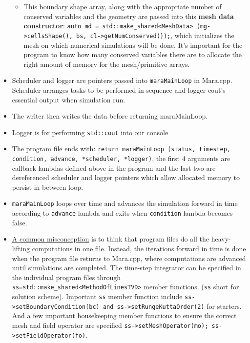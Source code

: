 \documentclass{article}
\begin{document}
\begin{itemize}
\begin{itemize}
		\item This boundary shape array, along with the appropriate number of conserved variables and the geometry are passed into this \textbf{mesh data constructor}: \texttt{auto md = std::make\_shared<MeshData> (mg->cellsShape(), bs, cl->getNumConserved());}, which initializes the mesh on which numerical simulations will be done. It's important for the program to know how many conserved variables there are to allocate the right amount of memory for the mesh/primitive arrays.		
		
	\end{itemize}
	
	
	\item Scheduler and logger are pointers passed into \texttt{maraMainLoop} in Mara.cpp. Scheduler arranges tasks to be performed in sequence and logger cout's essential output when simulation run. 
	
	\item The writer then writes the data before returning maraMainLoop.
	
	\item Logger is for performing \texttt{std::cout} into our console 
	
	\item The program file ends with: \texttt{return maraMainLoop (status, timestep, condition, advance, *scheduler, *logger)}, the first 4 arguments are callback lambdas defined above in the program and the last two are dereferenced scheduler and logger pointers which allow allocated memory to persist in between loop.
	
	\item \texttt{maraMainLoop} loops over time and advances the simulation forward in time according to \texttt{advance} lambda and exits when \texttt{condition} lambda becomes false.
	
	\item \underline{A common misconception} is to think that program files do all the heavy-lifting computations in one file. Instead, the iterations forward in time is done when the program file returns to Mara.cpp, where computations are advanced until simulations are completed. The time-step integrator can be specified in the individual program files through \texttt{ss=std::make\_shared<MethodOfLinesTVD>} member functions. (\texttt{ss} short for solution scheme). Important \texttt{ss} member function include \texttt{ss->setBoundaryCondition(bc) and ss->setRungeKuttaOrder(2)} for starters. And a few important housekeeping member functions to ensure the correct mesh and field operator are specified \texttt{ss->setMeshOperator(mo); ss->setFieldOperator(fo)}.

\end{itemize}
\end{document}
